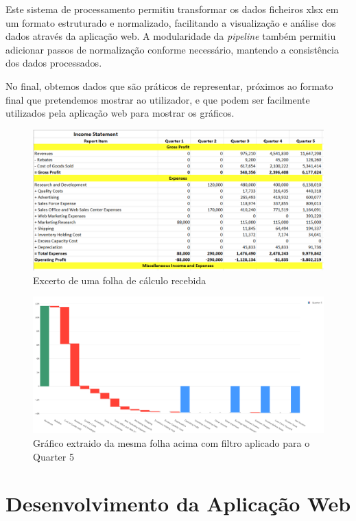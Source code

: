 Este sistema de processamento permitiu transformar os dados ficheiros \gls{xlsx} em um formato estruturado e normalizado, facilitando a visualização e análise dos dados através da aplicação web. A modularidade da \textit{pipeline} também permitiu adicionar passos de normalização conforme necessário, mantendo a consistência dos dados processados.

No final, obtemos dados que são práticos de representar, próximos ao formato final que pretendemos mostrar ao utilizador, e que podem ser facilmente utilizados pela aplicação web para mostrar os gráficos.

\begin{figure}[H]
\centering
\includegraphics[width=\textwidth]{./img/before}
\caption{Excerto de uma folha de cálculo recebida}
\end{figure}

\begin{figure}[H]
\centering
\includegraphics[width=\textwidth]{./img/after}
\caption{Gráfico extraido da mesma folha acima com filtro aplicado para o Quarter 5}
\end{figure}

\section{Desenvolvimento da Aplicação Web}

